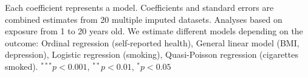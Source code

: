 \begin{table}[htp]
\begin{center}
\begin{threeparttable}
\begin{tabular}{l D{.}{.}{4.3} D{.}{.}{4.3} D{.}{.}{4.3} D{.}{.}{4.3} D{.}{.}{4.4} }
\end{tabular}
\begin{tablenotes}
\scriptsize
\item Each coefficient represents a model. Coefficients and standard errors are combined estimates from 20 multiple imputed datasets. Analyses based on exposure from 1 to 20 years old. We estimate different models depending on the outcome: Ordinal regression (self-reported health), General linear model (BMI, depression), Logistic regression (smoking), Quasi-Poisson regression (cigarettes smoked). $^{***}p<0.001$, $^{**}p<0.01$, $^*p<0.05$
\end{tablenotes}
\label{tab:psid_qr_models}
\end{threeparttable}
\end{center}
\end{table}
